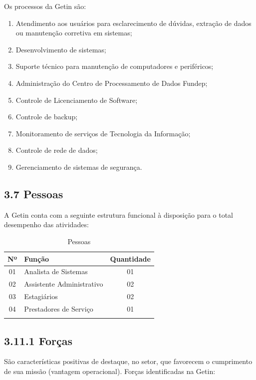 \documentclass{article}
\begin{document}
Os processos da Getin são:
\begin{enumerate}
    \item Atendimento aos usuários para esclarecimento de dúvidas, extração de dados ou manutenção corretiva em sistemas;
    \item Desenvolvimento de sistemas;
    \item Suporte técnico para manutenção de computadores e periféricos;
    \item Administração do Centro de Processamento de Dados Fundep;
    \item Controle de Licenciamento de Software;
    \item Controle de backup;
    \item Monitoramento de serviços de Tecnologia da Informação;
    \item Controle de rede de dados;
    \item Gerenciamento de sistemas de segurança.
\end{enumerate}

\subsection*{3.7 Pessoas}

A Getin conta com a seguinte estrutura funcional à disposição para o total desempenho das atividades:

\begin{longtable}{|c|p{6cm}|c|}
\toprule
Nº & Função & Quantidade \\
\midrule
01 & Analista de Sistemas & 01 \\
02 & Assistente Administrativo & 02 \\
03 & Estagiários & 02 \\
04 & Prestadores de Serviço & 01 \\
\bottomrule
\caption{Pessoas}
\label{tab:pessoas}
\end{longtable}

\subsection*{3.11.1 Forças}

São características positivas de destaque, no setor, que favorecem o cumprimento de sua missão (vantagem operacional).
Forças identificadas na Getin:
\end{document}
